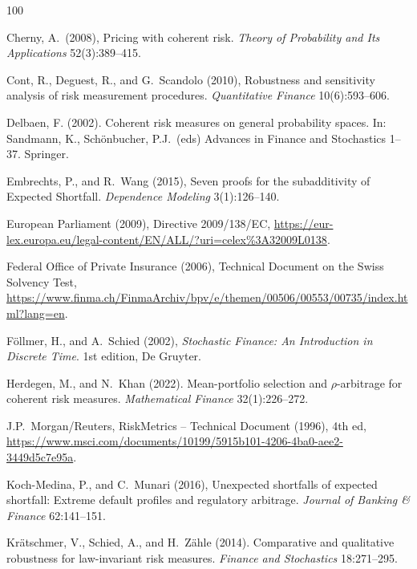\documentclass[12pt]{article}
\theoremstyle{plain}
\theoremstyle{definition}
\theoremstyle{remark}
\numberwithin{equation}{section}
\begin{document}
\begin{thebibliography}{100}
{ Cherny, A.\ (2008), Pricing with coherent risk. {\em Theory of Probability and Its Applications} 52(3):389--415.

 Cont, R., Deguest, R., and G.\ Scandolo (2010), Robustness and sensitivity analysis of risk measurement procedures. {\em Quantitative Finance} 10(6):593--606.

 Delbaen, F. (2002). Coherent risk measures on general probability spaces. In: Sandmann, K., Sch\"{o}nbucher, P.J.\ (eds) Advances in Finance and Stochastics 1--37. Springer.

 Embrechts, P., and R.\ Wang (2015), Seven proofs for the subadditivity of Expected Shortfall. \textit{Dependence Modeling} 3(1):126--140.

 European Parliament (2009), Directive 2009/138/EC, \url{https://eur-lex.europa.eu/legal-content/EN/ALL/?uri=celex\%3A32009L0138}.

 Federal Office of Private Insurance (2006), Technical Document on the Swiss Solvency Test, \url{https://www.finma.ch/FinmaArchiv/bpv/e/themen/00506/00553/00735/index.html?lang=en}.

 F\"ollmer, H., and A.\ Schied (2002), \textit{Stochastic Finance: An Introduction in Discrete Time}. 1st edition, De Gruyter.


 Herdegen, M., and N.\ Khan (2022). Mean-portfolio selection and $\rho$-arbitrage for coherent risk measures. {\em Mathematical Finance} 32(1):226--272.

 J.P.\ Morgan/Reuters, RiskMetrics -- Technical Document (1996), 4th ed, \url{https://www.msci.com/documents/10199/5915b101-4206-4ba0-aee2-3449d5c7e95a}.

 Koch-Medina, P., and C.\ Munari (2016), Unexpected shortfalls of expected shortfall: Extreme default profiles and regulatory arbitrage. {\em Journal of Banking \& Finance} 62:141--151.

 Kr\"{a}tschmer, V., Schied, A., and H.\ Z\"{a}hle (2014). Comparative and qualitative robustness for law-invariant risk measures. {\em Finance and Stochastics} 18:271--295.

}
\end{thebibliography}
\end{document}
